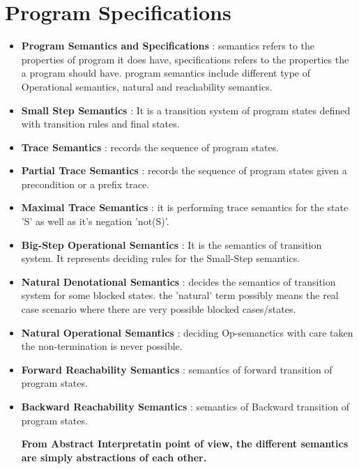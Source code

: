 \chapter{Program Specifications}

\begin{itemize}
	\item{\textbf{Program Semantics and Specifications} : semantics refers to the properties of program it does have, specifications refers to the properties the a program should have. program semantics include different type of Operational semantics, natural and reachability semantics.
	}

	\item{\textbf{Small Step Semantics} : It is a transition system of program states defined with transition rules and final states.
	}
	
	\item{\textbf{Trace Semantics } : records the sequence of program states.
	}
	
	\item{\textbf{Partial Trace Semantics } : records the sequence of program states given a precondition or a prefix trace.
	}
	
	\item{\textbf{Maximal Trace Semantics } : it is performing trace semantics for the state 'S' as well as it's negation 'not(S)'.
	}
	
	\item{\textbf{Big-Step Operational Semantics } : It is the semantics of transition system. It represents deciding rules for the Small-Step semantics.
	}
	
	\item{\textbf{ Natural Denotational Semantics} : decides the semantics of transition system for some blocked states. the 'natural' term possibly means the real case scenario where there are very possible blocked cases/states. 
	}
	
	\item{\textbf{ Natural Operational Semantics} : deciding Op-semanctics with care taken the non-termination is never possible.
	}
	
	\item{\textbf{Forward Reachability Semantics } : semantics of forward transition of program states.
	}
	
	\item{\textbf{Backward Reachability Semantics} : semantics of Backward transition of program states.
	}
	

	\textbf{From Abstract Interpretatin point of view, the different semantics are simply abstractions of each other.}



\end{itemize}
